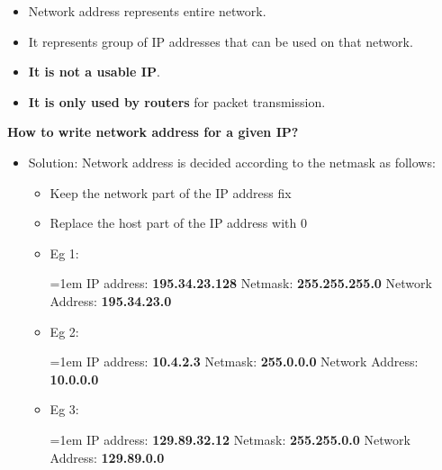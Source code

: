 \setlength{\columnsep}{3pt}
\begin{flushleft}
\bigskip
\begin{itemize}
	\item Network address represents entire network.
	\item  It represents group of IP addresses that can be used on that network.
	\item \textbf{It is not a usable IP}.
	\item \textbf{It is only used by routers} for packet transmission.
\end{itemize}


\textbf{How to write network address for a given IP?}
\begin{itemize}
	\item Solution: Network address is decided according to the netmask as follows:
	\begin{itemize}
		\item Keep the network part of the IP address fix
		\item Replace the host part of the IP address with 0
		\item Eg 1:
		\bigskip
		\begin{tcolorbox}[breakable,notitle,boxrule=-0pt,colback=pink,colframe=pink]
			\color{black}
			\font=1em
			IP address: \textbf{195.34.23.128}
			\newline
			Netmask: \textbf{255.255.255.0}
			\newline
			Network Address: \textbf{195.34.23.0}
			\font=4pt
		\end{tcolorbox}
		\item Eg 2:
		\bigskip
		\begin{tcolorbox}[breakable,notitle,boxrule=-0pt,colback=pink,colframe=pink]
			\color{black}
			\font=1em
			IP address: \textbf{10.4.2.3}
			\newline
			Netmask: \textbf{255.0.0.0}
			\newline
			Network Address: \textbf{10.0.0.0}
			\font=4pt
		\end{tcolorbox}
	\item Eg 3:
	\bigskip
	\begin{tcolorbox}[breakable,notitle,boxrule=-0pt,colback=pink,colframe=pink]
		\color{black}
		\font=1em
		IP address: \textbf{129.89.32.12}
		\newline
		Netmask: \textbf{255.255.0.0}
		\newline
		Network Address: \textbf{129.89.0.0}
		\font=4pt
	\end{tcolorbox}
	\end{itemize}


\end{itemize}

\end{flushleft}
\newpage